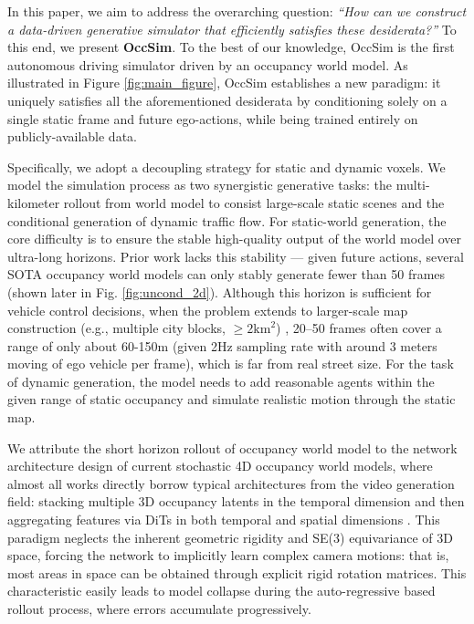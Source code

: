 In this paper, we aim to address the overarching question: \emph{``How can we construct a data-driven generative simulator that efficiently satisfies these desiderata?''} To this end, we present \textbf{OccSim}. To the best of our knowledge, OccSim is the first autonomous driving simulator driven by an occupancy world model. As illustrated in Figure \ref{fig:main_figure}, OccSim establishes a new paradigm: it uniquely satisfies all the aforementioned desiderata by conditioning solely on a single static frame and future ego-actions, while being trained entirely on publicly-available data.

Specifically, we adopt a decoupling strategy for static and dynamic voxels. We model the simulation process as two synergistic generative tasks: the multi-kilometer rollout from world model to consist large-scale static scenes and the conditional generation of dynamic traffic flow. For static-world generation, the core difficulty is to ensure the stable high-quality output of the world model over ultra-long horizons. Prior work lacks this stability --- given future actions, several SOTA occupancy world models\cite{shi2025come, liao2025i2} can only stably generate fewer than 50 frames (shown later in Fig. \ref{fig:uncond_2d}). Although this horizon is sufficient for vehicle control decisions, when the problem extends to larger-scale map construction (e.g., multiple city blocks, $\geq\!2\mathrm{km}^2$) , 20--50 frames often cover a range of only about 60-150m (given 2Hz sampling rate with around 3 meters moving of ego vehicle per frame), which is far from real street size. For the task of dynamic generation, the model needs to add reasonable agents within the given range of static occupancy and simulate realistic motion through the static map. 

We attribute the short horizon rollout of occupancy world model to the network architecture design of current stochastic 4D occupancy world models, where almost all works directly borrow typical architectures from the video generation field: stacking multiple 3D occupancy latents in the temporal dimension and then aggregating features via DiTs in both temporal and spatial dimensions \cite{gu2024dome, ma2024latte}. This paradigm neglects the inherent geometric rigidity and SE(3) equivariance of 3D space, forcing the network to implicitly learn complex camera motions: that is, most areas in space can be obtained through explicit rigid rotation matrices. This characteristic easily leads to model collapse during the auto-regressive based rollout process, where errors accumulate progressively. 

